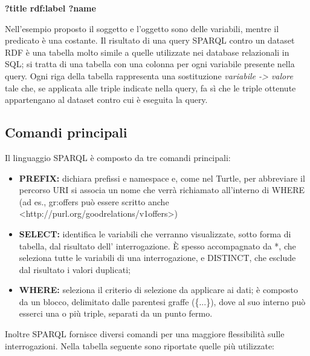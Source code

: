 \documentclass[a4paper,11pt]{article}
\begin{document}
\begin{center}	
	\textbf{?title rdf:label ?name}
\end{center}

Nell'esempio proposto il soggetto e l'oggetto sono delle variabili, mentre il predicato è una costante.
Il risultato di una query SPARQL contro un dataset RDF è una tabella molto simile a quelle utilizzate nei database relazionali in SQL; si tratta di una tabella con una colonna per ogni variabile presente nella query. Ogni riga della tabella rappresenta una sostituzione \textit{variabile -> valore} tale che, se applicata alle triple indicate nella query, fa sì che le triple ottenute appartengano al dataset contro cui è eseguita la query.

\subsection{Comandi principali}
\label{sec:4.1}
Il linguaggio SPARQL è composto da tre comandi principali:
\begin{itemize}
	\item \textbf{PREFIX:} dichiara prefissi e namespace e, come nel Turtle, per
abbreviare il percorso URI si associa un nome che verrà
richiamato all'interno di WHERE (ad es., gr:offers può essere
scritto anche <http://purl.org/goodrelations/v1offers>)
	\item \textbf{SELECT:} identifica le variabili che verranno visualizzate, sotto forma di tabella, dal risultato dell' interrogazione. È spesso
accompagnato da *, che seleziona tutte le variabili di una
interrogazione, e DISTINCT, che esclude dal risultato i valori
duplicati;
	\item \textbf{WHERE:} seleziona il criterio di selezione da applicare ai dati; è composto da un blocco, delimitato dalle parentesi graffe (\{...\}),
dove al suo interno può esserci una o più triple, separati da un
punto fermo.
	\end{itemize}
Inoltre SPARQL fornisce diversi comandi per una maggiore flessibilità sulle interrogazioni. Nella tabella seguente sono riportate quelle più utilizzate:
\end{document}
